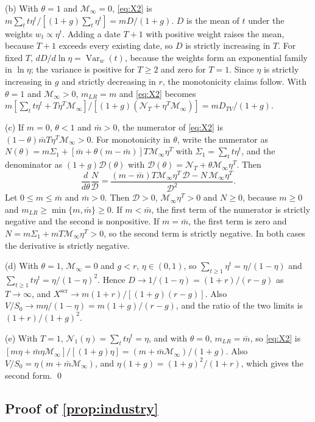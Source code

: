 (b) With $\theta=1$ and $\mathcal M_\infty=0$, \eqref{eq:X2} is $m\sum_tt\eta^t/[(1+g)\sum_t\eta^t]=mD/(1+g)$. $D$ is the mean of $t$ under the weights $w_t\propto\eta^t$. Adding a date $T+1$ with positive weight raises the mean, because $T+1$ exceeds every existing date, so $D$ is strictly increasing in $T$. For fixed $T$, $dD/d\ln\eta=\operatorname{Var}_w(t)$, because the weights form an exponential family in $\ln\eta$; the variance is positive for $T\ge 2$ and zero for $T=1$. Since $\eta$ is strictly increasing in $g$ and strictly decreasing in $r$, the monotonicity claims follow. With $\theta=1$ and $\mathcal M_\infty>0$, $m_{LR}=m$ and \eqref{eq:X2} becomes $m[\sum_tt\eta^t+T\eta^T\mathcal M_\infty]/[(1+g)(\mathcal N_T+\eta^T\mathcal M_\infty)]=mD_{TV}/(1+g)$.

(c) If $m=0$, $\theta<1$ and $\bar m>0$, the numerator of \eqref{eq:X2} is $(1-\theta)\bar mT\eta^T\mathcal M_\infty>0$. For monotonicity in $\theta$, write the numerator as $N(\theta)=m\Sigma_1+[\bar m+\theta(m-\bar m)]T\mathcal M_\infty\eta^T$ with $\Sigma_1=\sum_tt\eta^t$, and the denominator as $(1+g)\mathcal D(\theta)$ with $\mathcal D(\theta)=\mathcal N_T+\theta\mathcal M_\infty\eta^T$. Then
\[
\frac{d}{d\theta}\frac{N}{\mathcal D}=\frac{(m-\bar m)T\mathcal M_\infty\eta^T\,\mathcal D-N\,\mathcal M_\infty\eta^T}{\mathcal D^2}.
\]
Let $0\le m\le\bar m$ and $\bar m>0$. Then $\mathcal D>0$, $\mathcal M_\infty\eta^T>0$ and $N\ge 0$, because $m\ge 0$ and $m_{LR}\ge\min\{m,\bar m\}\ge 0$. If $m<\bar m$, the first term of the numerator is strictly negative and the second is nonpositive. If $m=\bar m$, the first term is zero and $N=m\Sigma_1+mT\mathcal M_\infty\eta^T>0$, so the second term is strictly negative. In both cases the derivative is strictly negative.

(d) With $\theta=1$, $\mathcal M_\infty=0$ and $g<r$, $\eta\in(0,1)$, so $\sum_{t\ge 1}\eta^t=\eta/(1-\eta)$ and $\sum_{t\ge 1}t\eta^t=\eta/(1-\eta)^2$. Hence $D\to 1/(1-\eta)=(1+r)/(r-g)$ as $T\to\infty$, and $X^{\mathrm{scr}}\to m(1+r)/[(1+g)(r-g)]$. Also $V/S_0\to m\eta/(1-\eta)=m(1+g)/(r-g)$, and the ratio of the two limits is $(1+r)/(1+g)^2$.

(e) With $T=1$, $\mathcal N_1(\eta)=\sum_tt\eta^t=\eta$, and with $\theta=0$, $m_{LR}=\bar m$, so \eqref{eq:X2} is $[m\eta+\bar m\eta\mathcal M_\infty]/[(1+g)\eta]=(m+\bar m\mathcal M_\infty)/(1+g)$. Also $V/S_0=\eta(m+\bar m\mathcal M_\infty)$, and $\eta(1+g)=(1+g)^2/(1+r)$, which gives the second form. \qed

\subsection*{Proof of \autoref{prop:industry}}

